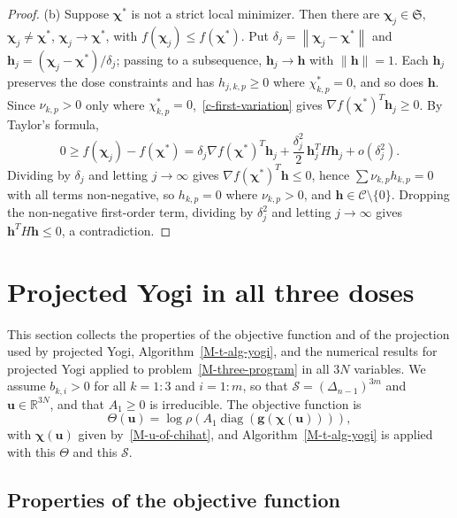 \documentclass[11pt]{article}
\theoremstyle{plain}
\theoremstyle{remark}
\numberwithin{equation}{section}
\begin{document}
\begin{proof}
(b) Suppose $\bm\chi^*$ is not a strict local minimizer. Then there are
$\bm\chi_j\in\mathfrak{S}$, $\bm\chi_j\ne\bm\chi^*$, $\bm\chi_j\to\bm\chi^*$,
with $f(\bm\chi_j)\le f(\bm\chi^*)$. Put $\delta_j=\left\|\bm\chi_j-\bm\chi^*\right\|$
and $\bm h_j=(\bm\chi_j-\bm\chi^*)/\delta_j$; passing to a subsequence,
$\bm h_j\to\bm h$ with $\|\bm h\|=1$. Each $\bm h_j$ preserves the dose
constraints and has $h_{j,k,p}\ge 0$ where $\chi^*_{k,p}=0$, and so does
$\bm h$. Since $\nu_{k,p}>0$ only where $\chi^*_{k,p}=0$,~\eqref{c-first-variation}
gives $\nabla f(\bm\chi^*)^T\bm h_j\ge 0$. By Taylor's formula,
\begin{equation*}
0\ge f(\bm\chi_j)-f(\bm\chi^*)
=\delta_j\nabla f(\bm\chi^*)^T\bm h_j+\frac{\delta_j^2}{2}\,\bm h_j^TH\bm h_j+o\left(\delta_j^2\right).
\end{equation*}
Dividing by $\delta_j$ and letting $j\to\infty$ gives
$\nabla f(\bm\chi^*)^T\bm h\le 0$, hence
$\sum\nu_{k,p}h_{k,p}=0$ with all terms non-negative, so $h_{k,p}=0$ where
$\nu_{k,p}>0$, and $\bm h\in\mathcal{C}\setminus\{0\}$. Dropping the
non-negative first-order term, dividing by $\delta_j^2$ and letting
$j\to\infty$ gives $\bm h^TH\bm h\le 0$, a contradiction.
\end{proof}

\section{Projected Yogi in all three doses}\label{sec-joint-yogi}

This section collects the properties of the objective function and of the
projection used by projected Yogi, Algorithm~\ref{M-t-alg-yogi}, and the
numerical results for projected Yogi applied to
problem~\eqref{M-three-program} in all $3N$ variables. We assume
$b_{k,i}>0$ for all $k=1:3$ and $i=1:m$, so that
$\mathcal{S}=\left(\Delta_{n-1}\right)^{3m}$ and $\bm u\in\mathbb{R}^{3N}$, and
that $A_1\ge 0$ is irreducible. The objective function is
\begin{equation}\label{t-F}
\Theta(\bm u)
=\log\rho\left(A_1\operatorname{diag}\left(\bm g\left(\bm\chi(\bm u)\right)\right)\right),
\end{equation}
with $\bm\chi(\bm u)$ given by~\eqref{M-u-of-chihat}, and
Algorithm~\ref{M-t-alg-yogi} is applied with this $\Theta$ and this
$\mathcal{S}$.

\subsection{Properties of the objective function}
\end{document}
